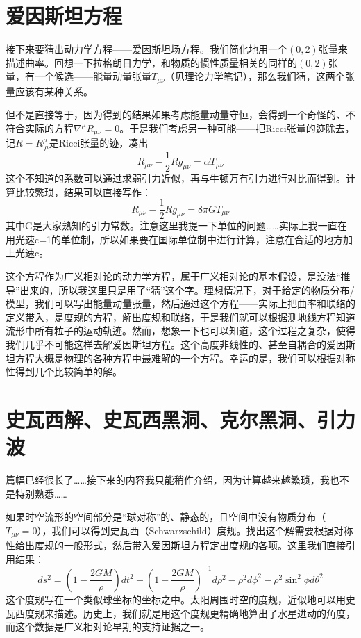 \documentclass{ctexart}
\begin{document}
\section{爱因斯坦方程}
接下来要猜出动力学方程——爱因斯坦场方程。我们简化地用一个$(0,2)$张量来描述曲率。回想一下拉格朗日力学，和物质的惯性质量相关的同样的$(0,2)$张量，有一个候选——能量动量张量$T_{\mu\nu}$（见理论力学笔记），那么我们猜，这两个张量应该有某种关系。

但不是直接等于，因为得到的结果如果考虑能量动量守恒，会得到一个奇怪的、不符合实际的方程$\nabla^\mu R_{\mu\nu}=0$。于是我们考虑另一种可能——把Ricci张量的迹除去，记$R=R^\mu_{\ \mu}$是Ricci张量的迹，凑出
\begin{equation}
R_{\mu\nu}-\frac{1}{2}Rg_{\mu\nu}=\alpha T_{\mu\nu}
\end{equation}
这个不知道的系数可以通过求弱引力近似，再与牛顿万有引力进行对比而得到。计算比较繁琐，结果可以直接写作：
\begin{equation}
R_{\mu\nu}-\frac{1}{2}Rg_{\mu\nu}=8\pi G T_{\mu\nu}
\end{equation}
其中G是大家熟知的引力常数。注意这里我提一下单位的问题……实际上我一直在用光速c=1的单位制，所以如果要在国际单位制中进行计算，注意在合适的地方加上光速c。

这个方程作为广义相对论的动力学方程，属于广义相对论的基本假设，是没法“推导”出来的，所以我这里只是用了“猜”这个字。理想情况下，对于给定的物质分布/模型，我们可以写出能量动量张量，然后通过这个方程——实际上把曲率和联络的定义带入，是度规的方程，解出度规和联络，于是我们就可以根据测地线方程知道流形中所有粒子的运动轨迹。然而，想象一下也可以知道，这个过程之复杂，使得我们几乎不可能这样去解爱因斯坦方程。这个高度非线性的、甚至自耦合的爱因斯坦方程大概是物理的各种方程中最难解的一个方程。幸运的是，我们可以根据对称性得到几个比较简单的解。


\section{史瓦西解、史瓦西黑洞、克尔黑洞、引力波}
篇幅已经很长了……接下来的内容我只能稍作介绍，因为计算越来越繁琐，我也不是特别熟悉……

如果时空流形的空间部分是“球对称”的、静态的，且空间中没有物质分布（$T_{\mu\nu}=0$），我们可以得到史瓦西（Schwarzschild）度规。找出这个解需要根据对称性给出度规的一般形式，然后带入爱因斯坦方程定出度规的各项。这里我们直接引用结果：
\begin{equation}
ds^2=(1-\frac{2GM}{\rho})dt^2-(1-\frac{2GM}{\rho})^{-1}d\rho^2-\rho^2d\phi^2-\rho^2\sin^2\phi d\theta^2
\end{equation}
这个度规写在一个类似球坐标的坐标之中。太阳周围时空的度规，近似地可以用史瓦西度规来描述。历史上，我们就是用这个度规更精确地算出了水星进动的角度，而这个数据是广义相对论早期的支持证据之一。
\end{document}
